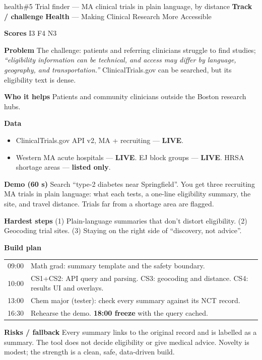\documentclass[11pt]{article}
\newcommand{\LIVE}{\textcolor{okgreen}{\textbf{LIVE}}}
\newcommand{\LISTED}{\textcolor{greyish}{\textbf{listed only}}}
\newcommand{\tagH}{\textcolor{health}{\textbf{Health}}}
\newcommand{\field}[1]{\textbf{\textsf{#1}}\quad}
\begin{document}
\begin{ideacard}{health}{\#5 \quad Trial finder --- MA clinical trials in plain language, by distance}
\field{Track / challenge} \tagH{} --- Making Clinical Research More Accessible\par
\field{Scores} I3 F4 N3

\field{Problem} The challenge: patients and referring clinicians struggle to find studies;
\emph{``eligibility information can be technical, and access may differ by language,
geography, and transportation.''} ClinicalTrials.gov can be searched, but its eligibility
text is dense.

\field{Who it helps} Patients and community clinicians outside the Boston research hubs.

\field{Data}
\begin{itemize}
\item ClinicalTrials.gov API v2, MA + recruiting --- \LIVE.
\item Western MA acute hospitals --- \LIVE. EJ block groups --- \LIVE. HRSA shortage areas --- \LISTED.
\end{itemize}

\field{Demo (60 s)} Search ``type-2 diabetes near Springfield''. You get three recruiting MA
trials in plain language: what each tests, a one-line eligibility summary, the site, and
travel distance. Trials far from a shortage area are flagged.

\field{Hardest steps} (1) Plain-language summaries that don't distort eligibility.
(2) Geocoding trial sites. (3) Staying on the right side of ``discovery, not advice''.

\field{Build plan}\par\nopagebreak
\begin{tabularx}{\linewidth}{@{}L{1.2cm} X@{}}
09:00 & Math grad: summary template and the safety boundary.\\
10:00 & CS1+CS2: API query and parsing. CS3: geocoding and distance. CS4: results UI and overlays.\\
13:00 & Chem major (tester): check every summary against its NCT record.\\
16:30 & Rehearse the demo. \textbf{18:00 freeze} with the query cached.\\
\end{tabularx}

\field{Risks / fallback} Every summary links to the original record and is labelled as a
summary. The tool does not decide eligibility or give medical advice. Novelty is modest; the
strength is a clean, safe, data-driven build.
\end{ideacard}
\end{document}
